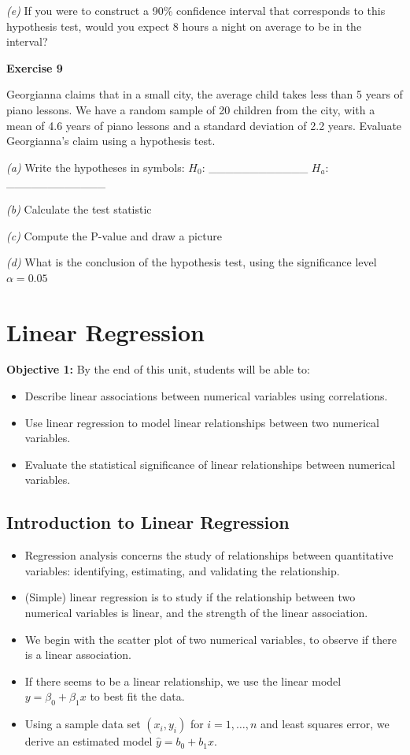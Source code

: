 \documentclass[
]{book}
\providecommand{\tightlist}{%
  \setlength{\itemsep}{0pt}\setlength{\parskip}{0pt}}
\begin{document}
\emph{(e)} If you were to construct a 90\% confidence interval that corresponds to this hypothesis test, would you expect 8 hours a night on average to be in the interval?

\textbf{Exercise 9}

Georgianna claims that in a small city, the average child takes less than 5 years of piano lessons. We have a random sample of 20 children from the city, with a mean of 4.6 years of piano lessons and a standard deviation of 2.2 years. Evaluate Georgianna's claim using a hypothesis test.

\emph{(a)} Write the hypotheses in symbols: \(H_0\): \_\_\_\_\_\_\_\_\_\_\_\_ \(H_a\): \_\_\_\_\_\_\_\_\_\_\_\_

\emph{(b)} Calculate the test statistic

\emph{(c)} Compute the P-value and draw a picture

\emph{(d)} What is the conclusion of the hypothesis test, using the significance level \(\alpha=0.05\)

\chapter{Linear Regression}\label{linear-regression}

\textbf{Objective 1:} By the end of this unit, students will be able to:

\begin{itemize}
\tightlist
\item
  Describe linear associations between numerical variables using correlations.
\item
  Use linear regression to model linear relationships between two numerical variables.
\item
  Evaluate the statistical significance of linear relationships between numerical variables.
\end{itemize}

\section{Introduction to Linear Regression}\label{introduction-to-linear-regression}

\begin{itemize}
\item
  Regression analysis concerns the study of relationships between quantitative variables: identifying, estimating, and validating the relationship.
\item
  (Simple) linear regression is to study if the relationship between two numerical variables is linear, and the strength of the linear association.
\item
  We begin with the scatter plot of two numerical variables, to observe if there is a linear association.
\item
  If there seems to be a linear relationship, we use the linear model \(y = \beta_0 + \beta_1x\) to best fit the data.
\item
  Using a sample data set \((x_i, y_i)\) for \(i = 1, \ldots, n\) and least squares error, we derive an estimated model \(\hat{y} = b_0 + b_1x\).
\end{itemize}
\end{document}
